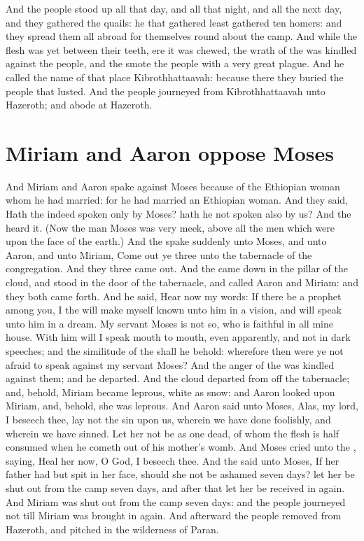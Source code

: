 \begin{biblechapter}
\verse And the people stood up all that day, and all that night, and all the next day, and they gathered the quails: he that gathered least gathered ten homers: and they spread them all abroad for themselves round about the camp.
\verse And while the flesh was yet between their teeth, ere it was chewed, the wrath of the \LORD was kindled against the people, and the \LORD smote the people with a very great plague.
\verse And he called the name of that place Kibrothhattaavah: because there they buried the people that lusted.
\verse And the people journeyed from Kibrothhattaavah unto Hazeroth; and abode at Hazeroth.
\end{biblechapter}

\section*{Miriam and Aaron oppose Moses}
\begin{biblechapter} %
\verse And Miriam and Aaron spake against Moses because of the Ethiopian woman whom he had married: for he had married an Ethiopian woman.
\verse And they said, Hath the \LORD indeed spoken only by Moses? hath he not spoken also by us? And the \LORD heard it.
\verse (Now the man Moses was very meek, above all the men which were upon the face of the earth.)
\verse And the \LORD spake suddenly unto Moses, and unto Aaron, and unto Miriam, Come out ye three unto the tabernacle of the congregation. And they three came out.
\verse And the \LORD came down in the pillar of the cloud, and stood in the door of the tabernacle, and called Aaron and Miriam: and they both came forth.
\verse And he said, Hear now my words: If there be a prophet among you, I the \LORD will make myself known unto him in a vision, and will speak unto him in a dream.
\verse My servant Moses is not so, who is faithful in all mine house.
\verse With him will I speak mouth to mouth, even apparently, and not in dark speeches; and the similitude of the \LORD shall he behold: wherefore then were ye not afraid to speak against my servant Moses?
\verse And the anger of the \LORD was kindled against them; and he departed.
\verse And the cloud departed from off the tabernacle; and, behold, Miriam became leprous, white as snow: and Aaron looked upon Miriam, and, behold, she was leprous.
\verse And Aaron said unto Moses, Alas, my lord, I beseech thee, lay not the sin upon us, wherein we have done foolishly, and wherein we have sinned.
\verse Let her not be as one dead, of whom the flesh is half consumed when he cometh out of his mother's womb.
\verse And Moses cried unto the \LORD, saying, Heal her now, O God, I beseech thee.
\verse And the \LORD said unto Moses, If her father had but spit in her face, should she not be ashamed seven days? let her be shut out from the camp seven days, and after that let her be received in again.
\verse And Miriam was shut out from the camp seven days: and the people journeyed not till Miriam was brought in again.
\verse And afterward the people removed from Hazeroth, and pitched in the wilderness of Paran.
\end{biblechapter}

